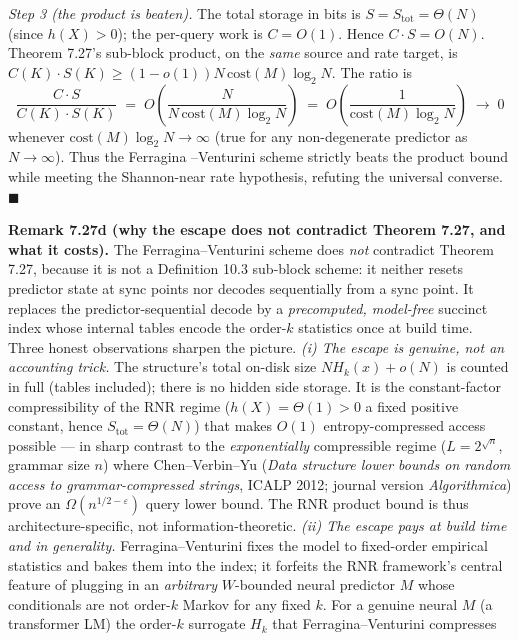 \documentclass[
]{article}
\begin{document}
\emph{Step 3 (the product is beaten).} The total storage in bits is
$S = S_{\mathrm{tot}} = \Theta(N)$ (since $h(X) > 0$); the per-query
work is $C = O(1)$. Hence $C \cdot S = O(N)$. Theorem 7.27's sub-block
product, on the \emph{same} source and rate target, is $C(K) \cdot S(K)
\geq (1-o(1)) N\, \mathrm{cost}(M) \log_2 N$. The ratio is
\[
  \frac{C \cdot S}{C(K) \cdot S(K)}
  \;=\; O\!\left(\frac{N}{N\, \mathrm{cost}(M) \log_2 N}\right)
  \;=\; O\!\left(\frac{1}{\mathrm{cost}(M) \log_2 N}\right)
  \;\to\; 0
\]
whenever $\mathrm{cost}(M)\log_2 N \to \infty$ (true for any
non-degenerate predictor as $N \to \infty$). Thus the Ferragina
--Venturini scheme strictly beats the product bound while meeting the
Shannon-near rate hypothesis, refuting the universal converse.
\hfill$\blacksquare$

\textbf{Remark 7.27d (why the escape does not contradict Theorem 7.27,
and what it costs).} The Ferragina--Venturini scheme does \emph{not}
contradict Theorem 7.27, because it is not a Definition 10.3 sub-block
scheme: it neither resets predictor state at sync points nor decodes
sequentially from a sync point. It replaces the predictor-sequential
decode by a \emph{precomputed, model-free} succinct index whose internal
tables encode the order-$k$ statistics once at build time. Three honest
observations sharpen the picture. \emph{(i) The escape is genuine, not
an accounting trick.} The structure's total on-disk size $N H_k(x) +
o(N)$ is counted in full (tables included); there is no hidden side
storage. It is the constant-factor compressibility of the RNR regime
($h(X) = \Theta(1) > 0$ a fixed positive constant, hence $S_{\mathrm{tot}} = \Theta(N)$) that
makes $O(1)$ entropy-compressed access possible --- in sharp contrast to
the \emph{exponentially} compressible regime ($L = 2^{\sqrt n}$, grammar
size $n$) where Chen--Verbin--Yu (\emph{Data structure lower bounds on
random access to grammar-compressed strings}, ICALP 2012; journal version
\emph{Algorithmica}) prove an $\Omega(n^{1/2 - \varepsilon})$ query lower
bound. The RNR product bound is thus architecture-specific, not
information-theoretic. \emph{(ii) The escape pays at build time and in
generality.} Ferragina--Venturini fixes the model to fixed-order
empirical statistics and bakes them into the index; it forfeits the
RNR framework's central feature of plugging in an \emph{arbitrary}
$W$-bounded neural predictor $M$ whose conditionals are not order-$k$
Markov for any fixed $k$. For a genuine neural $M$ (a transformer
LM) the order-$k$ surrogate $H_k$ that Ferragina--Venturini compresses
\end{document}
